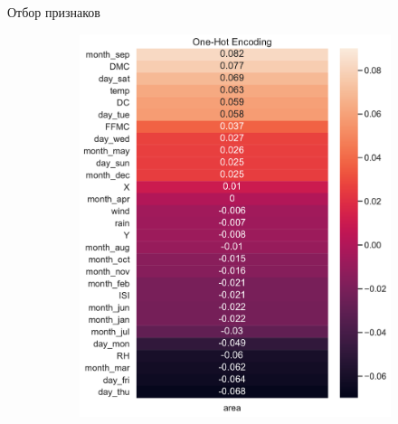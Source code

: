 \documentclass{beamer} %
\begin{document}
    \begin{frame}{Отбор признаков}
        \begin{figure}
            \centering
            \begin{subfigure}[b]{0.475\textwidth}
                \centering
                \includegraphics[width=\textwidth]{features_corr_oh.pdf}
            \end{subfigure}
            \hfill
            \begin{subfigure}[b]{0.475\textwidth}  
                \centering 

\end{subfigure}
\end{figure}
\end{frame}
\end{document}
